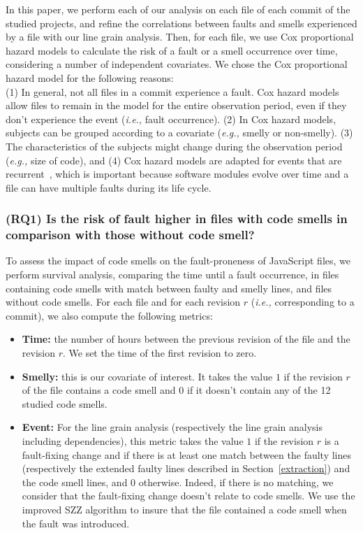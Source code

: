 \documentclass[smallcondensed]{svjour3}
\newcommand{\eg}{{\textit{e.g.,}}}
\newcommand{\ie}{{\textit{i.e.,}}}
\begin{document}
{In this paper, we perform each of our analysis {\color{blue} on each file of each commit of the studied projects, and refine the correlations between faults and smells experienced by a file with our line grain analysis.} Then, for each file, we use Cox proportional hazard models to calculate the risk of a fault or a smell occurrence over time, considering a number of independent covariates. We chose the Cox proportional hazard model for the following reasons:\\
(1) In general, not all files in a commit experience a fault. Cox hazard models allow files to remain in the model for the entire observation period, even if they don't experience the event (\ie{} fault occurrence). (2) In Cox hazard models, subjects can be grouped according to a covariate (\eg{} smelly or non-smelly). (3) The characteristics of the subjects might change during the observation period (\eg{} size of code), and (4) Cox hazard models are adapted for events that are recurrent~\cite{therneau2000modeling}, which is important because software modules evolve over time and a file can have multiple faults during its life cycle.
	
\subsubsection*{(RQ1) Is the risk of fault higher in files with code smells in comparison with those without code smell?}\label{AnalysisRQ1}

To assess the impact of code smells on the fault-proneness of JavaScript files, we perform survival analysis, comparing the time until a fault occurrence, in files containing code smells {\color{blue} with match between faulty and smelly lines}, and files without code smells. %
For each file and for each revision $r$ (\ie{} corresponding to a commit), we also compute the following metrics:
\begin{itemize}
	\item \textbf{Time:} the number of hours between the previous revision of the file and the revision $r$.
	We set the time of the first revision to zero.
	\item \textbf{Smelly:} this is our covariate of interest. It takes the value $1$ if the revision $r$ of the file contains a code smell and $0$ if it doesn't contain any of the 12 studied code smells.
	\item \textbf{Event:} For the line grain analysis (respectively the line grain analysis including dependencies), this metric takes the value $1$ if the revision $r$ is a fault-fixing change and if there is at least one match between the faulty lines (respectively the extended faulty lines described in Section~\ref{extraction}) and the code smell lines, and $0$ otherwise. Indeed, if there is no matching, we consider that the fault-fixing change doesn't relate to code smells. We use the improved SZZ algorithm to insure that the file contained a code smell when the fault was introduced.
\end{itemize}

}
\end{document}
